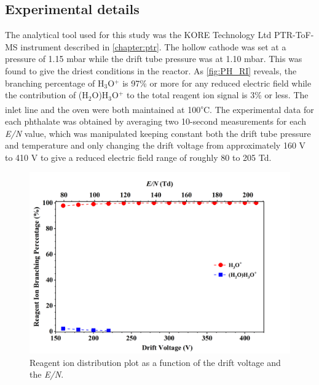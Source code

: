 
\subsection{Experimental details}

The analytical tool used for this study was the KORE Technology Ltd PTR-ToF-MS instrument described in \autoref{chapter:ptr}.
%
The hollow cathode was set at a pressure of 1.15 mbar while the drift tube pressure was at 1.10 mbar.
%
This was found to give the driest conditions in the reactor.
%
As \autoref{fig:PH_RI} reveals, the branching  percentage of H$_3$O$^+$ is   97\% or more for any reduced electric field while the contribution of  (H$_2$O)H$_3$O$^+$ to the total reagent ion signal is 3\% or less.
%
The inlet line and the oven were both maintained  at 100\textsuperscript{$\circ$}C.
%
The experimental data for each phthalate was obtained by averaging two 10-second measurements for each \textit{E/N} value, which was manipulated keeping constant both  the drift tube pressure and  temperature and only changing the drift voltage  from approximately 160 V to 410 V to give a reduced electric field range of roughly 80 to 205 Td.



        \begin{figure}[htb]%
        \centering
        \includegraphics[height=0.35\textheight]{pics/PH/RI-BR.png}
        \caption{Reagent ion distribution plot as a function of the drift voltage and the \textit{E/N}.}
        \label{fig:PH_RI}
        \end{figure}



